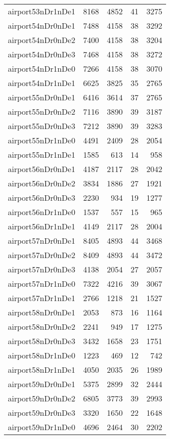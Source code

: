 \begin{longtable}{lrrrr}
airport53nDr1nDe1 & 8168 & 4852 & 41 & 3275 \\
airport54nDr0nDe1 & 7488 & 4158 & 38 & 3292 \\
airport54nDr0nDe2 & 7400 & 4158 & 38 & 3204 \\
airport54nDr0nDe3 & 7468 & 4158 & 38 & 3272 \\
airport54nDr1nDe0 & 7266 & 4158 & 38 & 3070 \\
airport54nDr1nDe1 & 6625 & 3825 & 35 & 2765 \\
airport55nDr0nDe1 & 6416 & 3614 & 37 & 2765 \\
airport55nDr0nDe2 & 7116 & 3890 & 39 & 3187 \\
airport55nDr0nDe3 & 7212 & 3890 & 39 & 3283 \\
airport55nDr1nDe0 & 4491 & 2409 & 28 & 2054 \\
airport55nDr1nDe1 & 1585 & 613 & 14 & 958 \\
airport56nDr0nDe1 & 4187 & 2117 & 28 & 2042 \\
airport56nDr0nDe2 & 3834 & 1886 & 27 & 1921 \\
airport56nDr0nDe3 & 2230 & 934 & 19 & 1277 \\
airport56nDr1nDe0 & 1537 & 557 & 15 & 965 \\
airport56nDr1nDe1 & 4149 & 2117 & 28 & 2004 \\
airport57nDr0nDe1 & 8405 & 4893 & 44 & 3468 \\
airport57nDr0nDe2 & 8409 & 4893 & 44 & 3472 \\
airport57nDr0nDe3 & 4138 & 2054 & 27 & 2057 \\
airport57nDr1nDe0 & 7322 & 4216 & 39 & 3067 \\
airport57nDr1nDe1 & 2766 & 1218 & 21 & 1527 \\
airport58nDr0nDe1 & 2053 & 873 & 16 & 1164 \\
airport58nDr0nDe2 & 2241 & 949 & 17 & 1275 \\
airport58nDr0nDe3 & 3432 & 1658 & 23 & 1751 \\
airport58nDr1nDe0 & 1223 & 469 & 12 & 742 \\
airport58nDr1nDe1 & 4050 & 2035 & 26 & 1989 \\
airport59nDr0nDe1 & 5375 & 2899 & 32 & 2444 \\
airport59nDr0nDe2 & 6805 & 3773 & 39 & 2993 \\
airport59nDr0nDe3 & 3320 & 1650 & 22 & 1648 \\
airport59nDr1nDe0 & 4696 & 2464 & 30 & 2202 \\

\end{longtable}
